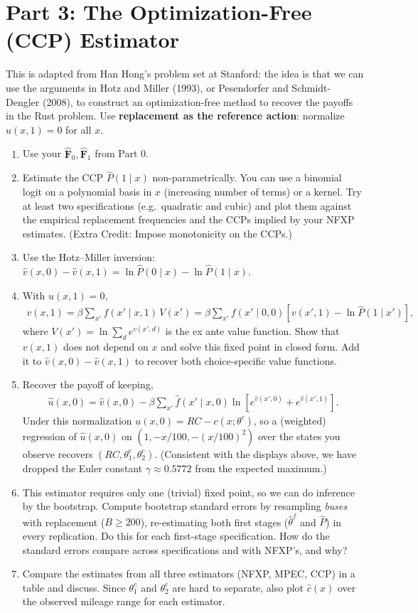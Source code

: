 \documentclass{article}
\begin{document}
\section*{Part 3: The Optimization-Free (CCP) Estimator}
This is adapted from Han Hong's problem set at Stanford: the idea is that we can use the arguments in Hotz and Miller (1993), or Pesendorfer and Schmidt-Dengler (2008), to construct an optimization-free method to recover the payoffs in the Rust problem. Use \textbf{replacement as the reference action}: normalize $u(x,1) = 0$ for all $x$.
\begin{enumerate}
\item Use your $\hat{\mathbf F}_0, \hat{\mathbf F}_1$ from Part 0.
\item Estimate the CCP $\hat P(1 \mid x)$ non-parametrically. You can use a binomial logit on a polynomial basis in $x$ (increasing number of terms) or a kernel. Try at least two specifications (e.g.\ quadratic and cubic) and plot them against the empirical replacement frequencies and the CCPs implied by your NFXP estimates. (Extra Credit: Impose monotonicity on the CCPs.)
\item Use the Hotz--Miller inversion: $\hat v(x,0) - \hat v(x,1) = \ln \hat P(0 \mid x) - \ln \hat P(1 \mid x)$.
\item With $u(x,1) = 0$,
\begin{align*}
v(x,1) = \beta \sum_{x'} f(x' \mid x,1)\, V(x') = \beta \sum_{x'} f(x' \mid 0,0) \left[ v(x',1) - \ln \hat P(1 \mid x') \right],
\end{align*}
where $V(x') = \ln \sum_d e^{v(x',d)}$ is the ex ante value function. Show that $v(x,1)$ does not depend on $x$ and solve this fixed point in closed form. Add it to $\hat v(x,0) - \hat v(x,1)$ to recover both choice-specific value functions.
\item Recover the payoff of keeping,
\begin{align*}
\hat u(x,0) = \hat v(x,0) - \beta \sum_{x'} \hat f(x' \mid x,0) \ln\left[ e^{\hat v(x',0)} + e^{\hat v(x',1)} \right].
\end{align*}
Under this normalization $u(x,0) = RC - c(x;\theta^c)$, so a (weighted) regression of $\hat u(x,0)$ on $(1, -x/100, -(x/100)^2)$ over the states you observe recovers $(RC, \theta^c_1, \theta^c_2)$. (Consistent with the displays above, we have dropped the Euler constant $\gamma \approx 0.5772$ from the expected maximum.)
\item This estimator requires only one (trivial) fixed point, so we can do inference by the bootstrap. Compute bootstrap standard errors by resampling \emph{buses} with replacement ($B \geq 200$), re-estimating both first stages ($\hat\theta^f$ and $\hat P$) in every replication. Do this for each first-stage specification. How do the standard errors compare across specifications and with NFXP's, and why?
\item Compare the estimates from all three estimators (NFXP, MPEC, CCP) in a table and discuss. Since $\theta^c_1$ and $\theta^c_2$ are hard to separate, also plot $\hat c(x)$ over the observed mileage range for each estimator.
\end{enumerate}
\end{document}
